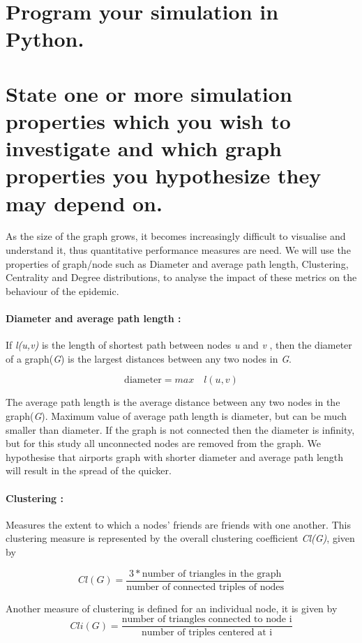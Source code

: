 \documentclass[a4paper,11pt]{article}
\begin{document}
\section{Program your simulation in Python.}


\section{State one or more simulation properties which you wish to investigate and which graph properties you hypothesize they may depend on.}

As the size of the graph grows, it becomes increasingly difficult to visualise and understand it, thus quantitative performance measures are need. We will use the properties of graph/node such as Diameter and average path length,  Clustering, Centrality and Degree distributions, to analyse the impact of these metrics on the behaviour of the epidemic.

\paragraph{Diameter and average path length :} If \textit{l(u,v)} is the length of shortest path between nodes \textit{u} and \textit{v} , then the diameter of a graph(\textit{G}) is the largest distances between any two nodes in \textit{G}.

 \[ \textrm{diameter} = max \quad l(u,v ) \] 


The average path length is the average distance between any two nodes in the graph(\textit{G}). Maximum value of average path length is diameter, but can be much smaller than diameter. If the graph is not connected then the diameter is infinity, but for this study all unconnected nodes are removed from the graph. We hypothesise that airports graph with shorter diameter and average path length will result in the spread of the quicker.

\paragraph{Clustering :} Measures the extent to which a nodes' friends are friends with one another. This clustering measure is represented by the overall clustering
coefficient \textit{Cl(G)}, given by


 \[ Cl(G) = \frac{3* \textrm{number of triangles in the graph}}{\textrm{number of connected triples of nodes}}\] 
 

Another measure of clustering is defined for an individual node, it is given by 
 \[Cli (G ) = \frac{\textrm{number of triangles connected to node i} }{ \textrm{number of triples centered at i}}\] 
\end{document}
